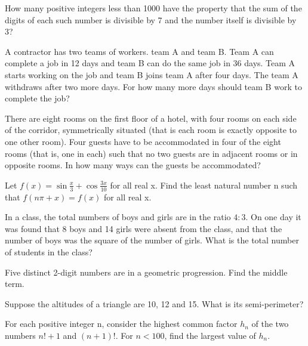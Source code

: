 \item How many positive integers less than 1000 have the property that the sum of the digits of each such number is divisible by 7 and the number itself is divisible by 3?

\item A contractor has two teams of workers. team A and team B. Team A can complete a job in 12 days and team B can do the same job in 36 days. Team A starts working on the job and team B joins team A after four days. The team A withdraws after two more days. For how many more days should team B work to complete the job? 

\item There are eight rooms on the ﬁrst ﬂoor of a hotel, with four rooms on each side of the corridor, symmetrically situated (that is each room is exactly opposite to one other room). Four guests have to be accommodated in four of the eight rooms (that is, one in each) such that no two guests are in adjacent rooms or in opposite rooms. In how many ways can the guests be accommodated?

\item Let $f(x) = \sin \frac{x}{3} + \cos\frac{3x}{10}$ for all real x. Find the least natural number n such that 
$f(n \pi + x) = f(x)$ for all real x.

\item In a class, the total numbers of boys and girls are in the ratio $4 : 3$. On one day it was found that 8 boys and 14 girls were absent from the class, and that the number of boys was the square of the number of girls. What is the total number of students in the class?

\item Five distinct 2-digit numbers are in a geometric progression. Find the middle term.

\item Suppose the altitudes of a triangle are 10, 12 and 15. What is its semi-perimeter?

\item  For each positive integer n, consider the highest common factor $h_{n}$ of the two numbers 
$n! + 1$ and $(n + 1)!$. For 
$n < 100$, ﬁnd the largest value of $h_{n}$.


